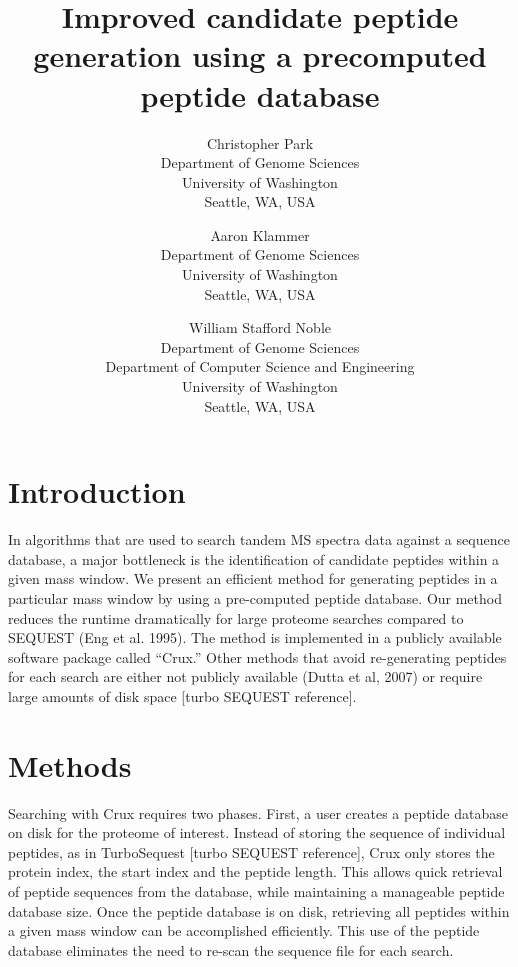 \documentclass[12pt]{article}
\begin{document}
\title{Improved candidate peptide generation using a precomputed
peptide database}

\author{
Christopher Park\\
Department of Genome Sciences\\
University of Washington\\
Seattle, WA, USA
\and
Aaron Klammer\\
Department of Genome Sciences\\
University of Washington\\
Seattle, WA, USA
\and
William Stafford Noble\\
Department of Genome Sciences\\
Department of Computer Science and Engineering\\
University of Washington\\
Seattle, WA, USA
}

\maketitle

\section{Introduction}

In algorithms that are used to search tandem MS spectra data against a
sequence database, a major bottleneck is the identification of
candidate peptides within a given mass window. We present an efficient
method for generating peptides in a particular mass window by using a
pre-computed peptide database. Our method reduces the runtime
dramatically for large proteome searches compared to SEQUEST (Eng et
al. 1995).  The method is implemented in a publicly available software
package called ``Crux.''  Other methods that avoid re-generating
peptides for each search are either not publicly available (Dutta et
al, 2007) or require large amounts of disk space [turbo SEQUEST
reference].

\section{Methods}

Searching with Crux requires two phases.  First, a user creates a
peptide database on disk for the proteome of interest.  Instead of
storing the sequence of individual peptides, as in TurboSequest [turbo
SEQUEST reference], Crux only stores the protein index, the start
index and the peptide length.  This allows quick retrieval of peptide
sequences from the database, while maintaining a manageable peptide
database size.  Once the peptide database is on disk, retrieving all
peptides within a given mass window can be accomplished efficiently.
This use of the peptide database eliminates the need to re-scan the
sequence file for each search.
\end{document}
